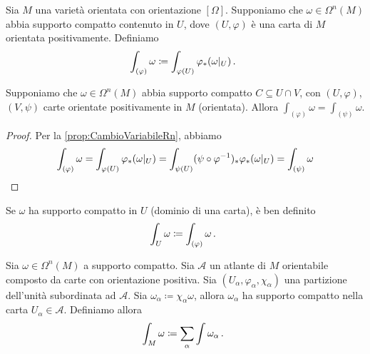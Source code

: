 \begin{definition}
	Sia $M$ una varietà orientata con orientazione $[\Omega]$. Supponiamo che $\omega \in \Omega^n(M)$ abbia supporto compatto contenuto in $U$, dove $(U,\varphi)$ è una carta di $M$ orientata positivamente.
	Definiamo
	\begin{equation*}
		\int_{(\varphi)} \omega \coloneqq \int_{\varphi(U)} \varphi_*(\omega |_ U) \, \text{. }
	\end{equation*}
\end{definition}

\begin{proposition}
	Supponiamo che $\omega\in \Omega^n(M)$ abbia supporto compatto $C\subseteq U\cap V$, con $(U,\varphi)$, $(V,\psi)$ carte orientate positivamente in $M$ (orientata).
	Allora $\int_{(\varphi)} \omega = \int_{(\psi)} \omega$.
\end{proposition}
\begin{proof}
	Per la \cref{prop:CambioVariabileRn}, abbiamo
	\begin{equation*}
		\int_{(\varphi)} \omega = \int_{\varphi(U)} \varphi_*(\omega|_ U) = \int_{\psi(U)} (\psi\circ \varphi^{-1})_* \varphi_*(\omega |_ U) = \int_{(\psi)} \omega
	\end{equation*}
\end{proof}

\begin{corollary}
	Se $\omega$ ha supporto compatto in $U$ (dominio di una carta), è ben definito
	\begin{equation*}
		\int_U \omega \coloneqq \int_{(\varphi)} \omega \, \text{. }
	\end{equation*}
\end{corollary}


\begin{definition}
	Sia $\omega \in \Omega^n(M)$ a supporto compatto. Sia $\mathcal A$ un atlante di $M$ orientabile composto da carte con orientazione positiva. Sia $(U_\alpha, \varphi_\alpha, \chi_\alpha)$ una partizione dell'unità subordinata ad $\mathcal A$. Sia $\omega_\alpha \coloneqq \chi_\alpha\omega$, allora $\omega_\alpha$ ha supporto compatto nella carta $U_\alpha\in\mathcal A$. %
	Definiamo allora
	\begin{equation*}
		\int_M \omega \coloneqq \sum_\alpha \int \omega_\alpha \, \text{. }
	\end{equation*}
\end{definition}

